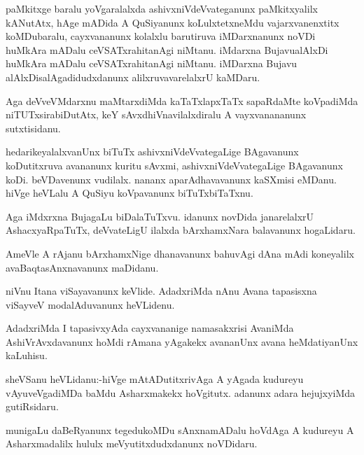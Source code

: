 \documentclass{article}
\begin{document}
\begin{mn}%
paMkitxge baralu yoVgaralalxda ashivxniVdeVvateganunx paMkitxyalilx kANutAtx, hAge mADida 
A QuSiyanunx koLulxtetxneMdu vajarxvanenxtitx koMDubaralu, cayxvananunx kolalxlu barutiruva
iMDarxnanunx noVDi huMkAra mADalu ceVSATxrahitanAgi niMtanu. iMdarxna BujavualAlxDi 
huMkAra mADalu ceVSATxrahitanAgi niMtanu. iMDarxna Bujavu alAlxDisalAgadidudxdanunx 
alilxruvavarelalxrU kaMDaru.
\end{mn}

\begin{mn}%
Aga deVveVMdarxnu maMtarxdiMda kaTaTxlapxTaTx sapaRdaMte koVpadiMda niTUTxsirabiDutAtx, 
keY sAvxdhiVnavilalxdiralu A vayxvanananunx sutxtisidanu.
\end{mn}

\begin{mn}%
hedarikeyalalxvanUnx biTuTx ashivxniVdeVvategaLige BAgavanunx koDutitxruva avananunx 
kuritu sAvxmi, ashivxniVdeVvategaLige BAgavanunx koDi. beVDavenunx vudilalx. nananx 
aparAdhavavanunx kaSXmisi eMDanu. hiVge heVLalu A QuSiyu koVpavanunx biTuTxbiTaTxnu.
\end{mn}

\begin{mn}%
Aga iMdxrxna BujagaLu biDalaTuTxvu. idanunx novDida janarelalxrU AshacxyaRpaTuTx, 
deVvateLigU ilalxda bArxhamxNara balavanunx hogaLidaru.
\end{mn}

\begin{mn}%
AmeVle A rAjanu bArxhamxNige dhanavanunx bahuvAgi dAna mAdi koneyalilx 
avaBaqtasAnxnavanunx maDidanu. 
\end{mn}

\begin{mn}%
niVnu Itana viSayavanunx keVlide. AdadxriMda nAnu Avana tapasisxna viSayveV modalAduvanunx 
heVLidenu.
\end{mn}

\begin{mn}%
AdadxriMda I tapasivxyAda cayxvananige namasakxrisi AvaniMda AshiVrAvxdavanunx hoMdi 
rAmana yAgakekx avananUnx avana heMdatiyanUnx kaLuhisu.
\end{mn}

\begin{mn}%
sheVSanu heVLidanu:-hiVge mAtADutitxrivAga A yAgada kudureyu vAyuveVgadiMDa baMdu 
Asharxmakekx hoVgitutx. adanunx adara hejujxyiMda gutiRsidaru.
\end{mn}

\begin{mn}%
munigaLu daBeRyanunx tegedukoMDu sAnxnamADalu hoVdAga A kudureyu A Asharxmadalilx hululx
meVyutitxdudxdanunx noVDidaru.
\end{mn}
\end{document}
